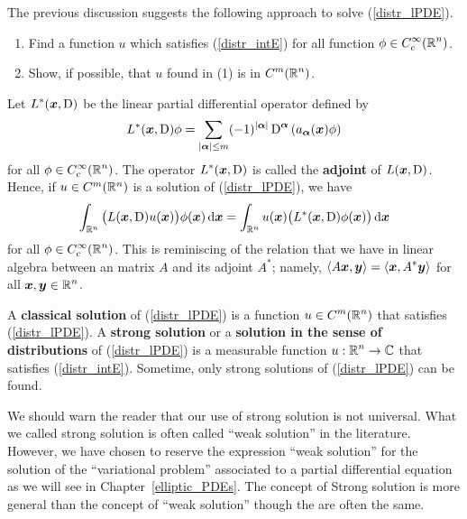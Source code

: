 The previous discussion suggests the following approach to solve
(\ref{distr_lPDE}).
\begin{enumerate}
\item Find a function $u$ which satisfies (\ref{distr_intE}) for all
function $\displaystyle \phi \in C_c^\infty(\mathbb{R}^n)$.
\item Show, if possible, that $u$ found in (1) is in
$\displaystyle C^m(\mathbb{R}^n)$.
\end{enumerate}

Let $\displaystyle L^\ast({\bm{x}}, \operatorname{D})$ be the linear partial
differential operator defined by
\[
L^\ast({\bm{x}}, \operatorname{D})\phi = \sum_{|{\bm{\alpha}}|\leq m} (-1)^{|{\bm{\alpha}}|}
\operatorname{D}^{{\bm{\alpha}}} \left( a_{{\bm{\alpha}}}({\bm{x}}) \phi \right)
\]
for all $\displaystyle \phi \in C_c^\infty(\mathbb{R}^n)$.  The
operator $\displaystyle L^\ast({\bm{x}}, \operatorname{D})$ is called the
{\bfseries adjoint} of
$L({\bm{x}}, \operatorname{D})$.  Hence, if $u \in C^m(\mathbb{R}^n)$ is a solution of
(\ref{distr_lPDE}), we have
\[
\int_{\mathbb{R}^n} \big( L({\bm{x}}, \operatorname{D})u({\bm{x}}) \big) \phi({\bm{x}}) \,\mathrm{d}{{\bm{x}}}
= \int_{\mathbb{R}^n} u({\bm{x}}) \big( L^\ast({\bm{x}}, \operatorname{D})\phi({\bm{x}})
\big) \,\mathrm{d}{{\bm{x}}}
\]
for all $\displaystyle \phi \in C_c^\infty(\mathbb{R}^n)$.
This is reminiscing of the relation that we have in linear algebra between an
\nn matrix $A$ and its adjoint $\displaystyle A^\ast$; namely,
$\displaystyle \left\langle{A{\bm{x}}} , {{\bm{y}}}\right\rangle = \left\langle{{\bm{x}}} , {A^\ast{\bm{y}}}\right\rangle$
for all $\displaystyle {\bm{x}}, {\bm{y}} \in \mathbb{R}^n$.

A {\bfseries classical solution}
of (\ref{distr_lPDE}) is a function
$\displaystyle u\in C^m(\mathbb{R}^n)$ that satisfies (\ref{distr_lPDE}).
A {\bfseries strong solution} or a
{\bfseries solution in the sense of distributions} of (\ref{distr_lPDE}) is a measurable
function $\displaystyle u:\mathbb{R}^n \to \mathbb{C}$ that satisfies (\ref{distr_intE}).
Sometime, only strong solutions of (\ref{distr_lPDE}) can be found.

We should warn the reader that our use of strong solution is not
universal.  What we called strong solution is often called
``weak solution'' in the literature.   However, we have chosen to
reserve the expression ``weak solution'' for the solution of the
``variational problem'' associated to a partial differential equation
as we will see in Chapter~\ref{elliptic_PDEs}.  The concept of
Strong solution is more general than the concept of ``weak solution''
though the are often the same.

